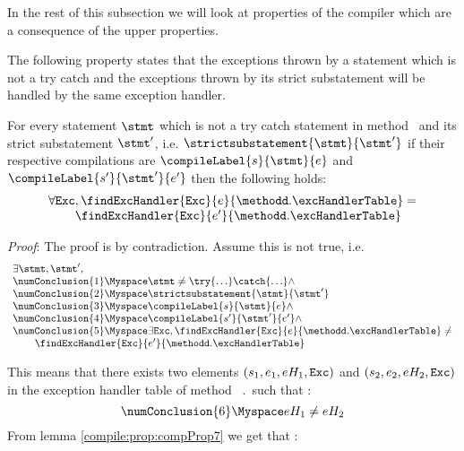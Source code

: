 In the rest of this subsection we will look at properties of the compiler which are a consequence of the upper properties.





The following property states that the exceptions thrown by a 
statement which is not a try catch and the  exceptions thrown by its strict substatement
will be handled by the same exception handler.

\begin{compProp8}\label{compile:prop:compProp8}
  For every statement $\stmt$ which is not a try catch statement  in method \methodd \  and  its strict substatement $\stmt'$, i.e. 
$\strictsubstatement{\stmt}{\stmt'} $
if their respective compilations are  $\compileLabel{s}{\stmt}{e}$ and  $\compileLabel{s'}{\stmt'}{e'}$ then the following holds:
$$ \begin{array}{l}
          \forall \mbox{\rm\tt{Exc}}, \findExcHandler{\mbox{\rm\tt{Exc}} }{e}{\methodd.\excHandlerTable} = \\
	  \phantom{\forall \mbox{\rm\tt{Exc}} }\findExcHandler{\mbox{\rm\tt{Exc}} }{e'}{\methodd.\excHandlerTable} 
   \end{array}
$$

\end{compProp8}
\textit{Proof}:
The proof is by contradiction. Assume this is not true, i.e.
 $$\begin{array}{l} \exists \stmt, \stmt' ,   \\
       \numConclusion{1}    \Myspace \stmt \neq \try \{ \ldots \} \catch \{ \ldots \} \wedge \\
       \numConclusion{2}   \Myspace  \strictsubstatement{\stmt}{\stmt'} \\
       \numConclusion{3}  \Myspace  \compileLabel{s}{\stmt}{e} \wedge \\
       \numConclusion{4} \Myspace  \compileLabel{s'}{\stmt'}{e'} \wedge \\
       \numConclusion{5}  \Myspace \exists  \mbox{\rm\tt{Exc}}, \findExcHandler{\mbox{\rm\tt{Exc}} }{e}{\methodd.\excHandlerTable} \neq \\
                                            \phantom{\exists \mbox{\rm\tt{Exc}} }\findExcHandler{\mbox{\rm\tt{Exc}} }{e'}{\methodd.\excHandlerTable}    
\end{array}
$$

This means that there exists two elements $   (s_1,e_1, eH_1, \mbox{\rm\texttt{Exc}} ) $  and
$   (s_2,e_2, eH_2, \mbox{\rm\texttt{Exc}} )$  in the exception handler table of method \methodd \ \methodd.\excHandlerTable \  such that   : 
$$ \numConclusion{6}  \Myspace eH_1 \neq eH_2 $$
From lemma \ref{compile:prop:compProp7} we get that :

